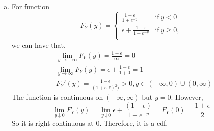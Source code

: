 \documentclass[letterpaper]{article}
\begin{document}
\begin{enumerate}[(a)]
        \item
        For function
        \[
        F_Y(y) = \begin{cases}
        \frac{1-\epsilon}{1+e^{-y}} & \text{if}~y < 0 \\
        \epsilon + \frac{1-\epsilon}{1+e^{-y}} & \text{if}~y \geq 0, \\
        \end{cases}
        \]
        we can have that,
        \begin{align*}
        & \lim_{y \to -\infty} F_Y(y) = \frac{1-\epsilon}{\infty} = 0 \\
        & \lim_{y \to \infty} F_Y(y) = \epsilon + \frac{1-\epsilon}{1+0} = 1 \\
        & F_Y'(y) = \frac{1-\epsilon}{(1+e^{-y})^2)} >0,  y \in (-\infty, 0) \cup (0, \infty) 
        \end{align*}
        The function is continuous on $(-\infty, \infty)$ but $y=0$. However,
        \[
        \lim_{y \downarrow 0} F_Y(y) = \lim_{y \downarrow 0} \epsilon + \frac{(1-\epsilon)}{1+e^{-y}} = F_Y(0) = \frac{1+\epsilon}{2} 
        \]
        So it is right continuous at $0$. Therefore, it is a cdf.

    \end{enumerate}
\end{document}

